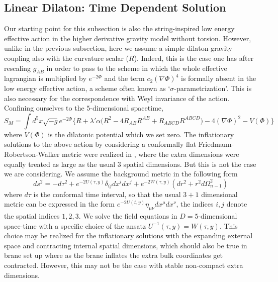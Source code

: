 \documentclass[a4paper,12pt]{article}
\begin{document}
\subsection{Linear Dilaton: Time Dependent Solution}
Our starting point for this subsection is also the string-inspired low 
energy effective action in the higher derivative gravity model without 
torsion. However, unlike in the previous subsection, here we assume a simple 
dilaton-gravity coupling also with the curvature scalar ($R$). Indeed, 
this is the case one has after 
rescaling $g_{AB}$ in order to pass to the scheme in which the whole 
effective lagrangian is multiplied by $e^{-2\Phi}$ and the term 
$c_2(\nabla\Phi)^4$ is formally absent in the low energy effective action, 
a scheme often known as `$\sigma$-parametrization'. This is also 
necessary for the correspondence with Weyl invariance of the action. 
Confining ourselves to the $5$-dimensional spacetime,  
\begin{equation}
S_M=\int d^5x\sqrt{-g}e^{-2\Phi}\Big\{
R+\lambda'\alpha\big(R^2-4 R_{AB}R^{AB}+R_{ABCD}R^{ABCD}\big)
-4(\nabla\Phi)^2-V(\Phi)\Big\}
\end{equation}
where $V(\Phi)$ is the dilatonic potential which we set zero. The 
inflationary solutions to the above action by considering a conformally flat 
Friedmann-Robertson-Walker metric were realized in \cite{ILS}, where the 
extra dimensions were equally treated as large as the usual 3 spatial 
dimensions. But this is not the case we are considering. We assume the 
background metric in the following form
\begin{equation}
ds^2 = - d\tau^2+e^{-2U(\tau, y)}\delta_{ij}dx^idx^j+e^{-2W(\tau, y)} 
(dr^2+r^2d\Omega_{n-1}^2)
\end{equation}
where $d\tau$ is the conformal time interval, so that the usual $3+1$ 
dimensional metric can be expressed in the form 
$e^{-2U(t, y)}\eta_{\mu\nu}dx^{\mu}dx^{\nu}$, the indices $i,j$ denote 
the spatial indices $1,2,3$. We solve the field equations in 
$D=5$-dimensional space-time with a specific choice of the ansatz 
$U^{-1}(\tau, y)=W(\tau, y)$. This choice may be realized for the 
inflationary solutions with the expanding external space and contracting 
internal spatial dimensions, which should also be true in brane set up 
where as the brane inflates the extra bulk coordinates get contracted. 
However, this may not be the case with stable non-compact extra dimensions. 
\end{document}
